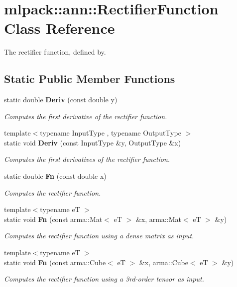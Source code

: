 \section{mlpack\+:\+:ann\+:\+:Rectifier\+Function Class Reference}
\label{classmlpack_1_1ann_1_1RectifierFunction}


The rectifier function, defined by.  


\subsection*{Static Public Member Functions}
\begin{DoxyCompactItemize}
\item 
static double {\bf Deriv} (const double y)
\begin{DoxyCompactList}\small\item\em Computes the first derivative of the rectifier function. \end{DoxyCompactList}\item 
{\footnotesize template$<$typename Input\+Type , typename Output\+Type $>$ }\\static void {\bf Deriv} (const Input\+Type \&y, Output\+Type \&x)
\begin{DoxyCompactList}\small\item\em Computes the first derivatives of the rectifier function. \end{DoxyCompactList}\item 
static double {\bf Fn} (const double x)
\begin{DoxyCompactList}\small\item\em Computes the rectifier function. \end{DoxyCompactList}\item 
{\footnotesize template$<$typename eT $>$ }\\static void {\bf Fn} (const arma\+::\+Mat$<$ eT $>$ \&x, arma\+::\+Mat$<$ eT $>$ \&y)
\begin{DoxyCompactList}\small\item\em Computes the rectifier function using a dense matrix as input. \end{DoxyCompactList}\item 
{\footnotesize template$<$typename eT $>$ }\\static void {\bf Fn} (const arma\+::\+Cube$<$ eT $>$ \&x, arma\+::\+Cube$<$ eT $>$ \&y)
\begin{DoxyCompactList}\small\item\em Computes the rectifier function using a 3rd-\/order tensor as input. \end{DoxyCompactList}\end{DoxyCompactItemize}


